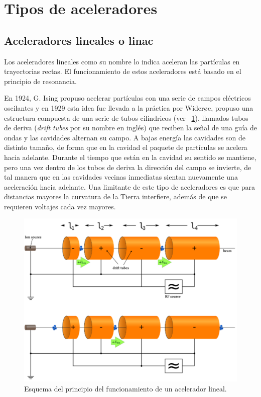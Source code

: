 \documentclass[12pt]{article}
\theoremstyle{break}
\theoremstyle{nonumberbreak}
\begin{document}
    \section{Tipos de aceleradores}

    \subsection{Aceleradores lineales o linac}

    Los aceleradores lineales como su nombre lo indica aceleran las partículas en trayectorias rectas. El funcionamiento de estos aceleradores está basado en el principio de resonancia.

    En 1924, G. Ising propuso acelerar partículas con una serie de campos eléctricos oscilantes y en 1929 esta idea fue llevada a la práctica por Wider\o e, propuso una estructura compuesta de una serie de tubos cilíndricos (ver~ \cref{fig:linac}), llamados tubos de deriva (\emph{drift tubes} por su nombre en inglés) que reciben la señal de una guía de ondas y las cavidades alternan su campo. A bajas energía las cavidades son de distinto tamaño, de forma que en la cavidad el paquete de partículas se acelera hacia adelante. Durante el tiempo que están en la cavidad su sentido se mantiene, pero una vez dentro de los tubos de deriva la dirección del campo se invierte, de tal manera que en las cavidades vecinas inmediatas sientan nuevamente una aceleración hacia adelante.\cite{conte2008introduction,moreno2020aceleradores} Una limitante de este tipo de aceleradores es que para distancias mayores la curvatura de la Tierra interfiere, además de que se requieren voltajes cada vez mayores.

    \begin{figure}[!htb]
        \centering
        \includegraphics[scale=0.6]{linac}
        \caption{Esquema del principio del funcionamiento de un acelerador lineal.\cite{moreno2020aceleradores}}
        \label{fig:linac}
    \end{figure}
\end{document}
